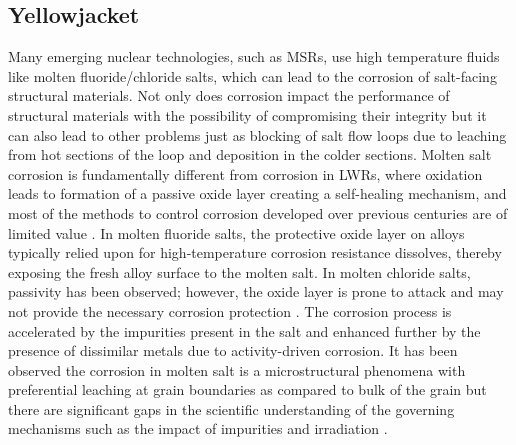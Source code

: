 \subsection{Yellowjacket}
	Many emerging nuclear technologies, such as MSRs, use high temperature fluids like molten fluoride/chloride salts, which can lead to the corrosion of salt-facing structural materials. Not only does corrosion impact the performance of structural materials with the possibility of compromising their integrity but it can also lead to other problems just as blocking of salt flow loops due to leaching from hot sections of the loop and deposition in the colder sections. Molten salt corrosion is fundamentally different from corrosion in LWRs, where oxidation leads to formation of a passive oxide layer creating a self-healing mechanism, and most of the methods to control corrosion developed over previous centuries are of limited value \cite{Yoshioka:2017aa}. In molten fluoride salts, the protective oxide layer on alloys typically relied upon for high-temperature corrosion resistance dissolves, thereby exposing the fresh alloy surface to the molten salt. In molten chloride salts, passivity has been observed; however, the oxide layer is prone to attack and may not provide the necessary corrosion protection \cite{Sridharan:2013aa}. The corrosion process is accelerated by the impurities present in the salt and enhanced further by the presence of dissimilar metals due to activity-driven corrosion. It has been observed the corrosion in molten salt is a microstructural phenomena with preferential leaching at grain boundaries as compared to bulk of the grain but there are significant gaps in the scientific understanding of the governing mechanisms such as the impact of impurities and irradiation \cite{Zheng:2018aa,Zhou:2020aa,Zhu:2021aa,Raiman:2018aa,Pillai:2021aa,Guo:2018aa}.
	
